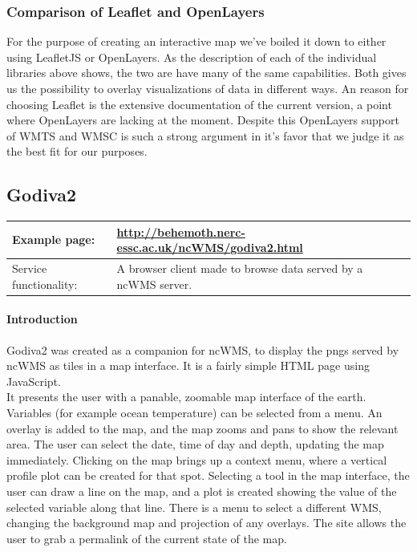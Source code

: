 \documentclass[11pt,a4paper,titlepage,oneside]{report}
\begin{document}
  \subsubsection{Comparison of Leaflet and OpenLayers}
    For the purpose of creating an interactive map we've boiled it down to either using LeafletJS or OpenLayers. As the description of each of the individual libraries above shows, the two are have many of the same capabilities. Both gives us the possibility to overlay visualizations of data in different ways. An reason for choosing Leaflet is the extensive documentation of the current version, a point where OpenLayers are lacking at the moment. Despite this OpenLayers support of \gls{WMTS} and \gls{WMSC} is such a strong argument in it's favor that we judge it as the best fit for our purposes.
    
  \subsection{Godiva2}
     \begin{tabular}{|p{4cm}|p{8cm}|}
     \hline
     Example page: & \url{http://behemoth.nerc-essc.ac.uk/ncWMS/godiva2.html} \\
     \hline
     Service functionality: & A browser client made to browse data served by a ncWMS server. \\
     \hline
   \end{tabular}
   
  \paragraph{Introduction}
  Godiva2 was created as a companion for ncWMS, to display the pngs served by ncWMS as tiles in a map interface. It is a fairly simple \gls{HTML} page using JavaScript. \\
   It presents the user with a panable, zoomable map interface of the earth. Variables (for example ocean temperature) can be selected from a menu. An overlay is added to the map, and the map zooms and pans to show the relevant area. The user can select the date, time of day and depth, updating the map immediately. Clicking on the map brings up a context menu, where a vertical profile plot can be created for that spot. Selecting a tool in the map interface, the user can draw a line on the map, and a plot is created showing the value of the selected variable along that line. There is a menu to select a different \gls{WMS}, changing the background map and projection of any overlays. The site allows the user to grab a permalink of the current state of the map.
\end{document}
